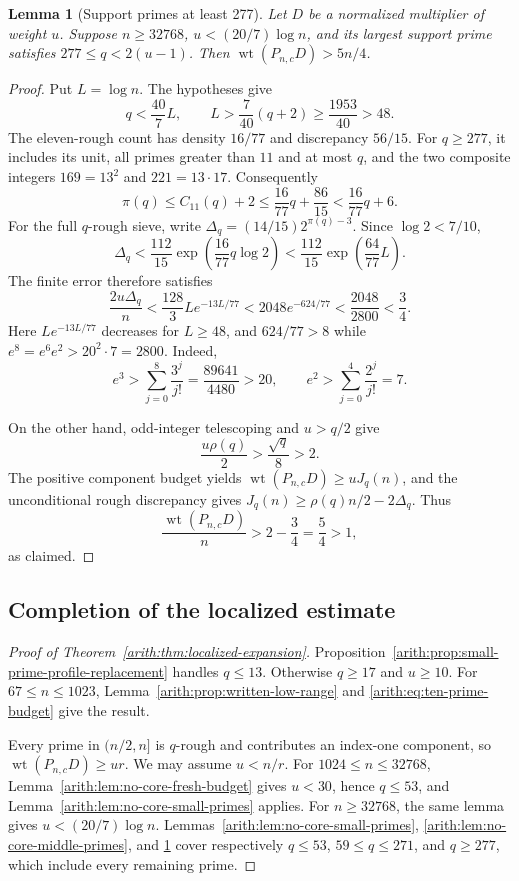 \documentclass[11pt]{article}
\DeclareMathOperator{\wt}{wt}\DeclareMathOperator{\ord}{ord}
\numberwithin{equation}{section}
\newtheorem{lemma}[theorem]{Lemma}
\theoremstyle{definition}\newtheorem{definition}[theorem]{Definition}
\theoremstyle{remark}\newtheorem{remark}[theorem]{Remark}
\begin{document}
\begin{lemma}[Support primes at least 277]
\label{arith:lem:no-core-large-primes}
Let $D$ be a normalized multiplier of weight $u$.
Suppose $n\ge32768$, $u<(20/7)\log n$, and its largest support
prime satisfies $277\le q<2(u-1)$. Then $\wt(P_{n,c}D)>5n/4$.
\end{lemma}
\begin{proof}
Put $L=\log n$. The hypotheses give
\[
 q<\frac{40}{7}L,\qquad
 L>\frac7{40}(q+2)\ge\frac{1953}{40}>48.
\]
The eleven-rough count has density $16/77$ and discrepancy $56/15$.
For $q\ge277$, it includes its unit, all primes greater than $11$ and at most $q$,
and the two composite integers $169=13^2$ and $221=13\cdot17$.
Consequently
\[
 \pi(q)\le C_{11}(q)+2
 \le\frac{16}{77}q+\frac{86}{15}
 <\frac{16}{77}q+6.
\]
For the full $q$-rough sieve, write
$\Delta_q=(14/15)2^{\pi(q)-3}$.  Since $\log2<7/10$,
\[
 \Delta_q<\frac{112}{15}
       \exp\left(\frac{16}{77}q\log2\right)
 <\frac{112}{15}\exp\left(\frac{64}{77}L\right).
\]
The finite error therefore satisfies
\[
 \frac{2u\Delta_q}{n}
 <\frac{128}{3}L e^{-13L/77}
 <2048e^{-624/77}<\frac{2048}{2800}<\frac34.
\]
Here $Le^{-13L/77}$ decreases for $L\ge48$, and
$624/77>8$ while $e^8=e^6e^2>20^2\cdot7=2800$.
Indeed,
\[
 e^3>\sum_{j=0}^{8}\frac{3^j}{j!}
       =\frac{89641}{4480}>20,
 \qquad
 e^2>\sum_{j=0}^{4}\frac{2^j}{j!}=7.
\]

On the other hand, odd-integer telescoping and $u>q/2$ give
\[
                      \frac{u\rho(q)}2>\frac{\sqrt q}{8}>2.
\]
The positive component budget yields $\wt(P_{n,c}D)\ge uJ_q(n)$, and
the unconditional rough discrepancy gives
$J_q(n)\ge\rho(q)n/2-2\Delta_q$.  Thus
\[
                \frac{\wt(P_{n,c}D)}n>2-\frac34=\frac54>1,
\]
as claimed.
\end{proof}

\subsection{Completion of the localized estimate}
\label{arith:sec:localized-completion}

\begin{proof}[Proof of Theorem~\ref{arith:thm:localized-expansion}]
Proposition~\ref{arith:prop:small-prime-profile-replacement} handles
$q\le13$. Otherwise $q\ge17$ and $u\ge10$. For $67\le n\le1023$,
Lemma~\ref{arith:prop:written-low-range} and
\eqref{arith:eq:ten-prime-budget} give the result.

Every prime in $(n/2,n]$ is $q$-rough and contributes an index-one
component, so $\wt(P_{n,c}D)\ge ur$. We may assume $u<n/r$.
For $1024\le n\le32768$, Lemma~\ref{arith:lem:no-core-fresh-budget}
gives $u<30$, hence $q\le53$, and
Lemma~\ref{arith:lem:no-core-small-primes} applies.
For $n\ge32768$, the same lemma gives $u<(20/7)\log n$.
Lemmas~\ref{arith:lem:no-core-small-primes},
\ref{arith:lem:no-core-middle-primes}, and
\ref{arith:lem:no-core-large-primes} cover respectively
$q\le53$, $59\le q\le271$, and $q\ge277$, which include every
remaining prime.
\end{proof}
\end{document}

